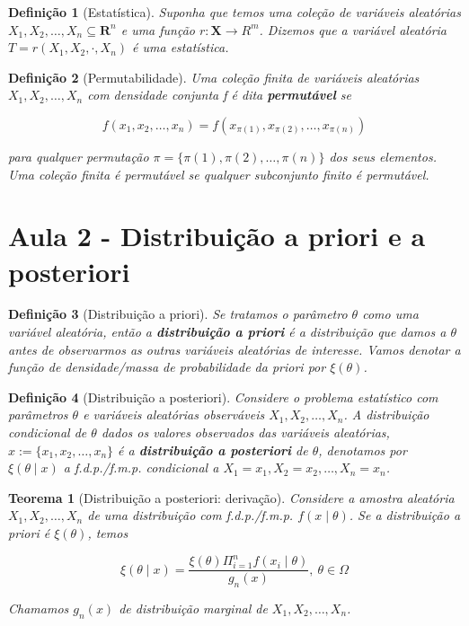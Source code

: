 \documentclass{article}
\newtheorem{theorem}{Teorema}
\newtheorem{definition}{Definição}
\begin{document}
\begin{definition}[Estatística]
Suponha que temos uma coleção de variáveis aleatórias $X_1, X_2, \ldots, X_n \subseteq \mathbf{R}^n$ e uma função $r: \mathbf{X} \rightarrow R^m$. Dizemos que a variável aleatória $T = r(X_1, X_2, \cdot, X_n)$ é uma estatística.
\end{definition}

\begin{definition}[Permutabilidade]
Uma coleção finita de variáveis aleatórias $X_1, X_2, \ldots, X_n$ com densidade conjunta f é dita \textbf{permutável} se

\begin{equation}
f(x_1, x_2, \ldots, x_n) = f(x_{\pi(1)}, x_{\pi(2)}, \ldots, x_{\pi(n)})
\end{equation}

para qualquer permutação $\pi = \{\pi(1), \pi(2), \ldots, \pi(n)\}$ dos seus elementos. Uma coleção finita é permutável se qualquer subconjunto finito é permutável.
\end{definition}

\section*{Aula 2 - Distribuição a priori e a posteriori}
\begin{definition}[Distribuição a priori]
Se tratamos o parâmetro $\theta$ como uma variável aleatória, então a \textbf{distribuição a priori} é a distribuição que damos a $\theta$ antes de observarmos as outras variáveis aleatórias de interesse. Vamos denotar a função de densidade/massa de probabilidade da priori por $\xi(\theta)$.
\end{definition}

\begin{definition}[Distribuição a posteriori]
Considere o problema estatístico com parâmetros $\theta$ e variáveis aleatórias observáveis $X_1, X_2, \ldots, X_n$. A distribuição condicional de $\theta$ dados os valores observados das variáveis aleatórias, $x := \{x_1, x_2, \ldots, x_n\}$ é a \textbf{distribuição a posteriori} de $\theta$, denotamos por $\xi(\theta \mid x)$ a f.d.p./f.m.p. condicional a $X_1 = x_1, X_2 = x_2, \ldots, X_n = x_n$.
\end{definition}

\begin{theorem}[Distribuição a posteriori: derivação]
Considere a amostra aleatória $X_1, X_2, \ldots, X_n$ de uma distribuição com f.d.p./f.m.p. $f(x \mid \theta)$. Se a distribuição a priori é $\xi(\theta)$, temos

\begin{equation}
\xi(\theta \mid x) = \frac{\xi(\theta) \Pi_{i = 1}^{n} f(x_i \mid \theta)}{g_n(x)}, \ \theta \in \Omega
\end{equation}

Chamamos $g_n(x)$ de distribuição marginal de $X_1, X_2, \ldots, X_n$.
\end{theorem}
\end{document}
